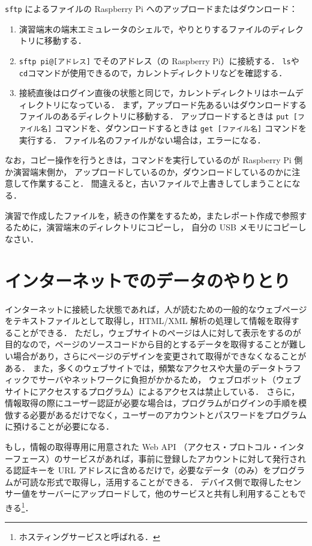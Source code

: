 \documentclass[11pt,a4,epsf]{report}
\begin{document}
\verb+sftp+ によるファイルの Raspberry Pi へのアップロードまたはダウンロード：
\begin{enumerate}
\item
演習端末の端末エミュレータのシェルで，やりとりするファイルのディレクトリに移動する．
\item
\verb+sftp pi@[アドレス]+ でそのアドレス（の Raspberry Pi）に接続する．
\verb+ls+や\verb+cd+コマンドが使用できるので，カレントディレクトリなどを確認する．
\item
接続直後はログイン直後の状態と同じで，カレントディレクトリはホームディレクトリになっている．
まず，アップロード先あるいはダウンロードするファイルのあるディレクトリに移動する．
アップロードするときは \verb+put [ファイル名]+ コマンドを、ダウンロードするときは \verb+get [ファイル名]+ コマンドを実行する．
ファイル名のファイルがない場合は，エラーになる．
\end{enumerate}

なお，コピー操作を行うときは，コマンドを実行しているのが Raspberry Pi 側か演習端末側か，
アップロードしているのか，ダウンロードしているのかに注意して作業すること．
間違えると，古いファイルで上書きしてしまうことになる．

\begin{excercise}
演習で作成したファイルを，続きの作業をするため，またレポート作成で参照するために，演習端末のディレクトリにコピーし，
自分の USB メモリにコピーしなさい．
\end{excercise}

\section{インターネットでのデータのやりとり}

インターネットに接続した状態であれば，人が読むための一般的なウェブページをテキストファイルとして取得し，HTML/XML 解析の処理して情報を取得することができる．
ただし，ウェブサイトのページは人に対して表示をするのが目的なので，ページのソースコードから目的とするデータを取得することが難しい場合があり，さらにページのデザインを変更されて取得ができなくなることがある．
また，多くのウェブサイトでは，頻繁なアクセスや大量のデータトラフィックでサーバやネットワークに負担がかかるため，
ウェブロボット（ウェブサイトにアクセスするプログラム）によるアクセスは禁止している．
さらに，情報取得の際にユーザー認証が必要な場合は，プログラムがログインの手順を模倣する必要があるだけでなく，ユーザーのアカウントとパスワードをプログラムに預けることが必要になる．

もし，情報の取得専用に用意された Web API （アクセス・プロトコル・インターフェース）のサービスがあれば，事前に登録したアカウントに対して発行される認証キーを URL アドレスに含めるだけで，必要なデータ（のみ）をプログラムが可読な形式で取得し，活用することができる．
デバイス側で取得したセンサー値をサーバーにアップロードして，他のサービスと共有し利用することもできる\footnote{ホスティングサービスと呼ばれる．}．
\end{document}
